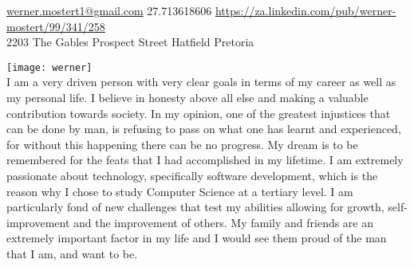 

\sloppy  %



\nobreakvspace{0.3em}  %

\noindent\href{mailto:werner.dot.mostert1.at.gmail.dot.com}{werner.mostert1\mbox{}@\mbox{}gmail.com}\sbull
\textsmaller{+}27.713618606\sbull
\href{https://za.linkedin.com/pub/werner-mostert/99/341/258}{https://za.linkedin.com/pub/werner-mostert/99/341/258}
\\
2203 The Gables Prospect Street\sbull
Hatfield\sbull
Pretoria\\

\spacedhrule{0.9em}{-0.4em}  %
\begin{center}
\end{center}


\vspace{-1.3em}  %
\begin{multicols}{3}%

\noindent \texttt{[image: werner]}\\I am a very driven person with very clear goals in terms of my career as well as my personal life. I believe in honesty above all else and making a valuable contribution towards society. In my opinion, one of the greatest injustices that can be done by man, is refusing to pass on what one has learnt and experienced, for without this happening there can be no progress. My dream is to be remembered for the feats that I had accomplished in my lifetime. I am extremely passionate about technology, specifically software development, which is the reason why I chose to study Computer Science at a tertiary level. I am particularly fond of new challenges that test my abilities allowing for growth, self-improvement and the improvement of others. My family and friends are an extremely important factor in my life and I would see them proud of the man that I am, and want to be. 

\end{multicols}

\spacedhrule{0em}{-0.4em}


